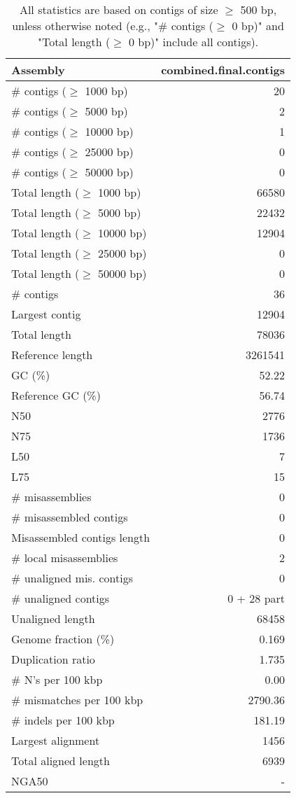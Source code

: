 \documentclass[12pt,a4paper]{article}
\begin{document}
\begin{table}[ht]
\begin{center}
\caption{All statistics are based on contigs of size $\geq$ 500 bp, unless otherwise noted (e.g., "\# contigs ($\geq$ 0 bp)" and "Total length ($\geq$ 0 bp)" include all contigs).}
\begin{tabular}{|l*{1}{|r}|}
\hline
Assembly & combined.final.contigs \\ \hline
\# contigs ($\geq$ 1000 bp) & 20 \\ \hline
\# contigs ($\geq$ 5000 bp) & 2 \\ \hline
\# contigs ($\geq$ 10000 bp) & 1 \\ \hline
\# contigs ($\geq$ 25000 bp) & 0 \\ \hline
\# contigs ($\geq$ 50000 bp) & 0 \\ \hline
Total length ($\geq$ 1000 bp) & 66580 \\ \hline
Total length ($\geq$ 5000 bp) & 22432 \\ \hline
Total length ($\geq$ 10000 bp) & 12904 \\ \hline
Total length ($\geq$ 25000 bp) & 0 \\ \hline
Total length ($\geq$ 50000 bp) & 0 \\ \hline
\# contigs & 36 \\ \hline
Largest contig & 12904 \\ \hline
Total length & 78036 \\ \hline
Reference length & 3261541 \\ \hline
GC (\%) & 52.22 \\ \hline
Reference GC (\%) & 56.74 \\ \hline
N50 & 2776 \\ \hline
N75 & 1736 \\ \hline
L50 & 7 \\ \hline
L75 & 15 \\ \hline
\# misassemblies & 0 \\ \hline
\# misassembled contigs & 0 \\ \hline
Misassembled contigs length & 0 \\ \hline
\# local misassemblies & 2 \\ \hline
\# unaligned mis. contigs & 0 \\ \hline
\# unaligned contigs & 0 + 28 part \\ \hline
Unaligned length & 68458 \\ \hline
Genome fraction (\%) & 0.169 \\ \hline
Duplication ratio & 1.735 \\ \hline
\# N's per 100 kbp & 0.00 \\ \hline
\# mismatches per 100 kbp & 2790.36 \\ \hline
\# indels per 100 kbp & 181.19 \\ \hline
Largest alignment & 1456 \\ \hline
Total aligned length & 6939 \\ \hline
NGA50 & - \\ \hline
\end{tabular}
\end{center}
\end{table}
\end{document}
